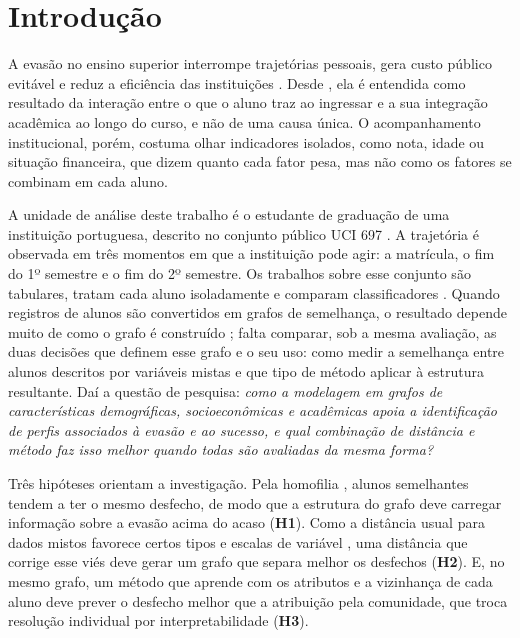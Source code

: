 \section{Introdução}
\label{introducao}

A evasão no ensino superior interrompe trajetórias pessoais, gera custo público evitável e reduz a eficiência das instituições \citep{realinho2022}. Desde \cite{tinto1975}, ela é entendida como resultado da interação entre o que o aluno traz ao ingressar e a sua integração acadêmica ao longo do curso, e não de uma causa única. O acompanhamento institucional, porém, costuma olhar indicadores isolados, como nota, idade ou situação financeira, que dizem quanto cada fator pesa, mas não como os fatores se combinam em cada aluno.

A unidade de análise deste trabalho é o estudante de graduação de uma instituição portuguesa, descrito no conjunto público UCI 697 \citep{realinho2022}. A trajetória é observada em três momentos em que a instituição pode agir: a matrícula, o fim do 1º semestre e o fim do 2º semestre. Os trabalhos sobre esse conjunto são tabulares, tratam cada aluno isoladamente e comparam classificadores \citep{realinho2022, villar2024}. Quando registros de alunos são convertidos em grafos de semelhança, o resultado depende muito de como o grafo é construído \citep{almeida2025}; falta comparar, sob a mesma avaliação, as duas decisões que definem esse grafo e o seu uso: como medir a semelhança entre alunos descritos por variáveis mistas e que tipo de método aplicar à estrutura resultante. Daí a questão de pesquisa: \textit{como a modelagem em grafos de características demográficas, socioeconômicas e acadêmicas apoia a identificação de perfis associados à evasão e ao sucesso, e qual combinação de distância e método faz isso melhor quando todas são avaliadas da mesma forma?}

Três hipóteses orientam a investigação. Pela homofilia \citep{mcpherson2001}, alunos semelhantes tendem a ter o mesmo desfecho, de modo que a estrutura do grafo deve carregar informação sobre a evasão acima do acaso (\textbf{H1}). Como a distância usual para dados mistos favorece certos tipos e escalas de variável \citep{vandevelden2026}, uma distância que corrige esse viés deve gerar um grafo que separa melhor os desfechos (\textbf{H2}). E, no mesmo grafo, um método que aprende com os atributos e a vizinhança de cada aluno deve prever o desfecho melhor que a atribuição pela comunidade, que troca resolução individual por interpretabilidade (\textbf{H3}).

